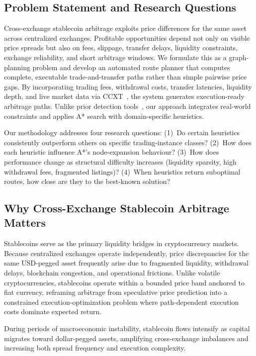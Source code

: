 \subsection{Problem Statement and Research Questions}

Cross-exchange stablecoin arbitrage exploits price differences for the same asset across centralized exchanges. Profitable opportunities depend not only on visible price spreads but also on fees, slippage, transfer delays, liquidity constraints, exchange reliability, and short arbitrage windows. We formulate this as a graph-planning problem and develop an automated route planner that computes complete, executable trade-and-transfer paths rather than simple pairwise price gaps. By incorporating trading fees, withdrawal costs, transfer latencies, liquidity depth, and live market data via CCXT~\cite{ccxt2024}, the system generates execution-ready arbitrage paths. Unlike prior detection tools~\cite{oanta2023crypto}, our approach integrates real-world constraints and applies A* search with domain-specific heuristics.

Our methodology addresses four research questions: (1)~Do certain heuristics consistently outperform others on specific trading-instance classes? (2)~How does each heuristic influence A*'s node-expansion behaviour? (3)~How does performance change as structural difficulty increases (liquidity sparsity, high withdrawal fees, fragmented listings)? (4)~When heuristics return suboptimal routes, how close are they to the best-known solution?

\subsection{Why Cross-Exchange Stablecoin Arbitrage Matters}

Stablecoins serve as the primary liquidity bridges in cryptocurrency markets. Because centralized exchanges operate independently, price discrepancies for the same USD-pegged asset frequently arise due to fragmented liquidity, withdrawal delays, blockchain congestion, and operational frictions. Unlike volatile cryptocurrencies, stablecoins operate within a bounded price band anchored to fiat currency, reframing arbitrage from speculative price prediction into a constrained execution-optimization problem where path-dependent execution costs dominate expected return.

During periods of macroeconomic instability, stablecoin flows intensify as capital migrates toward dollar-pegged assets, amplifying cross-exchange imbalances and increasing both spread frequency and execution complexity.

